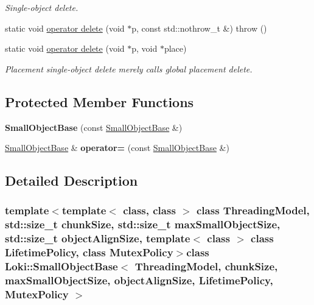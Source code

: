 \begin{DoxyCompactItemize}
\begin{DoxyCompactList}\small\item\em Single-\/object delete. \end{DoxyCompactList}\item 
static void \hyperlink{classLoki_1_1SmallObjectBase_ab835d84fa8bc1ed3a558dc2e7a7e39ec}{operator delete} (void $\ast$p, const std\+::nothrow\+\_\+t \&)  throw ()
\item 
\hypertarget{classLoki_1_1SmallObjectBase_ae2da17da13c6c6a0d7e33c9df9eb27f2}{}static void \hyperlink{classLoki_1_1SmallObjectBase_ae2da17da13c6c6a0d7e33c9df9eb27f2}{operator delete} (void $\ast$p, void $\ast$place)\label{classLoki_1_1SmallObjectBase_ae2da17da13c6c6a0d7e33c9df9eb27f2}

\begin{DoxyCompactList}\small\item\em Placement single-\/object delete merely calls global placement delete. \end{DoxyCompactList}\end{DoxyCompactItemize}
\subsection*{Protected Member Functions}
\begin{DoxyCompactItemize}
\item 
\hypertarget{classLoki_1_1SmallObjectBase_ad1c3a013df6cd2d95908003e006e1515}{}{\bfseries Small\+Object\+Base} (const \hyperlink{classLoki_1_1SmallObjectBase}{Small\+Object\+Base} \&)\label{classLoki_1_1SmallObjectBase_ad1c3a013df6cd2d95908003e006e1515}

\item 
\hypertarget{classLoki_1_1SmallObjectBase_a6e872e4f97b5572c294dc0162cbcccf6}{}\hyperlink{classLoki_1_1SmallObjectBase}{Small\+Object\+Base} \& {\bfseries operator=} (const \hyperlink{classLoki_1_1SmallObjectBase}{Small\+Object\+Base} \&)\label{classLoki_1_1SmallObjectBase_a6e872e4f97b5572c294dc0162cbcccf6}

\end{DoxyCompactItemize}


\subsection{Detailed Description}
\subsubsection*{template$<$template$<$ class, class $>$ class Threading\+Model, std\+::size\+\_\+t chunk\+Size, std\+::size\+\_\+t max\+Small\+Object\+Size, std\+::size\+\_\+t object\+Align\+Size, template$<$ class $>$ class Lifetime\+Policy, class Mutex\+Policy$>$class Loki\+::\+Small\+Object\+Base$<$ Threading\+Model, chunk\+Size, max\+Small\+Object\+Size, object\+Align\+Size, Lifetime\+Policy, Mutex\+Policy $>$}

